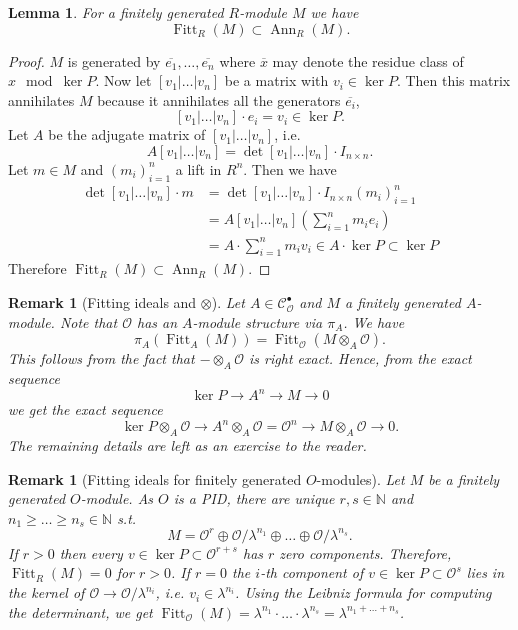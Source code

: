 \documentclass{article}
\theoremstyle{plain}%
\newtheorem{lemma}[theorem]{Lemma}
\newtheorem{remark}[theorem]{Remark}
\theoremstyle{definition}
\theoremstyle{remark}
\newcommand{\cob}{\mathcal{C}_\mathcal{O}^\bullet}
\newcommand{\ann}{\operatorname{Ann}}
\newcommand{\fitt}{\operatorname{Fitt}}
\begin{document}
\begin{lemma}\label{lem:fitting_and_ann}
    For a finitely generated \(R\)-module \(M\) we have
    \[\fitt_R(M) \subset \ann_R(M).\]
\end{lemma}
\begin{proof}
    \(M\) is generated by \(\overline{e_1}, \dots, \overline{e_n}\) where \(\overline{x}\) 
    may denote the residue class of \(x \mod \ker P\).
    Now let \([v_1|\dots|v_n]\) be a matrix with \(v_i \in \ker P\). Then this matrix annihilates \(M\) because
    it annihilates all the generators \(\overline{e_i}\),
    \[
        [v_1|\dots|v_n] \cdot e_i = v_i \in \ker P.
    \]
    Let \(A\) be the adjugate matrix of \([v_1|\dots|v_n]\), i.e. \[A[v_1|\dots|v_n] = \det [v_1|\dots|v_n]\cdot I_{n\times n}.\]
    Let \(m \in M\) and \((m_i)_{i=1}^n\) a lift in \(R^n\). Then we have 
    \begin{align*}
        \det [v_1|\dots|v_n] \cdot m &= \det [v_1|\dots|v_n]\cdot I_{n\times n} (m_i)_{i=1}^n \\
        &= A[v_1|\dots|v_n]\left(\sum_{i=1}^n m_i e_i\right)\\
        &= A \cdot \sum_{i=1}^n m_i v_i \in A \cdot \ker P \subset \ker P
    \end{align*}
    Therefore \(\fitt_R(M) \subset \ann_R(M)\).
\end{proof}

\begin{remark}[Fitting ideals and \(\otimes\)]\label{rem:fitting_and_tensor}
    Let \(A \in \cob\) and \(M\) a finitely generated \(A\)-module. 
    Note that \(\mathcal{O}\) has an \(A\)-module structure via \(\pi_A\).
    We have
    \[
        \pi_A(\fitt_A(M)) = \fitt_\mathcal{O}(M \otimes_A \mathcal{O}).
    \]
    This follows from the fact that \(- \otimes_A \mathcal{O}\) is right exact. 
    Hence, from the exact sequence
    \[
        \ker P \longrightarrow A^n \longrightarrow M \longrightarrow 0
    \]
    we get the exact sequence
    \[
        \ker P \otimes_A \mathcal{O} \longrightarrow A^n\otimes_A \mathcal{O} = \mathcal{O}^n 
        \longrightarrow M\otimes_A \mathcal{O} \longrightarrow 0.
    \]
    The remaining details are left as an exercise to the reader.
\end{remark}

\begin{remark}[Fitting ideals for finitely generated \(O\)-modules]
    Let \(M\) be a finitely generated \(O\)-module. As \(O\) is a PID, there are unique \(r,s \in \mathbb{N}\) 
    and \(n_1 \geq \dots \geq n_s \in \mathbb{N}\) s.t.
    \[
        M = \mathcal{O}^r \oplus \mathcal{O}/\lambda^{n_1} \oplus \dots \oplus \mathcal{O}/\lambda^{n_s}.
    \]
    If \(r > 0\) then every \(v \in \ker P \subset \mathcal{O}^{r + s}\) has \(r\) zero components.
    Therefore, \(\fitt_R (M) = 0\) for \(r > 0\).
    If \(r = 0\) the \(i\)-th component of \(v \in \ker P \subset \mathcal{O}^s\) 
    lies in the kernel of \(\mathcal{O} \to \mathcal{O}/\lambda^{n_i}\), 
    i.e. \(v_i \in \lambda^{n_i}\).
    Using the Leibniz formula for computing the determinant, we get
    \(\fitt_\mathcal{O}(M) = \lambda^{n_1} \cdot \dots \cdot \lambda^{n_s} = \lambda^{n_1 + \dots + n_s}\).
\end{remark}
\end{document}
